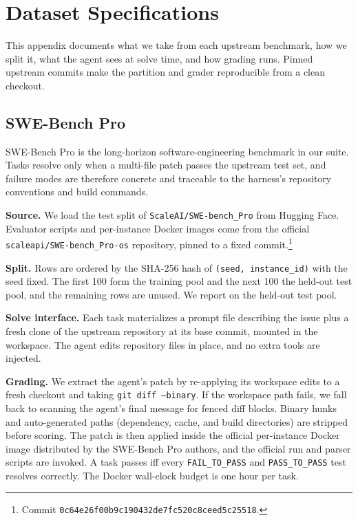 \section{Dataset Specifications}\label{app:datasets}

 This appendix documents what we take from each upstream benchmark, how we split it, what the agent sees at solve time, and how grading runs.
Pinned upstream commits make the partition and grader reproducible from a clean checkout.

\subsection{SWE-Bench Pro}

SWE-Bench Pro \citep{deng2025swebenchpro} is the long-horizon software-engineering benchmark in our suite.
Tasks resolve only when a multi-file patch passes the upstream test set, and failure modes are therefore concrete and traceable to the harness's repository conventions and build commands.

\noindent\textbf{Source.}
We load the test split of \texttt{ScaleAI/SWE-bench\_Pro} from Hugging Face.
Evaluator scripts and per-instance Docker images come from the official \texttt{scaleapi/SWE-bench\_Pro-os} repository, pinned to a fixed commit.\footnote{Commit \texttt{0c64e26f00b9c190432de7fc520c8ceed5c25518}.}

\noindent\textbf{Split.}
Rows are ordered by the SHA-256 hash of \texttt{(seed, instance\_id)} with the seed fixed.
The first 100 form the training pool and the next 100 the held-out test pool, and the remaining rows are unused.
We report on the held-out test pool.

\noindent\textbf{Solve interface.}
Each task materializes a prompt file describing the issue plus a fresh clone of the upstream repository at its base commit, mounted in the workspace.
The agent edits repository files in place, and no extra tools are injected.

\noindent\textbf{Grading.}
We extract the agent's patch by re-applying its workspace edits to a fresh checkout and taking \texttt{git diff --binary}.
If the workspace path fails, we fall back to scanning the agent's final message for fenced diff blocks.
Binary hunks and auto-generated paths (dependency, cache, and build directories) are stripped before scoring.
The patch is then applied inside the official per-instance Docker image distributed by the SWE-Bench Pro authors, and the official run and parser scripts are invoked.
A task passes iff every \texttt{FAIL\_TO\_PASS} and \texttt{PASS\_TO\_PASS} test resolves correctly.
The Docker wall-clock budget is one hour per task.

